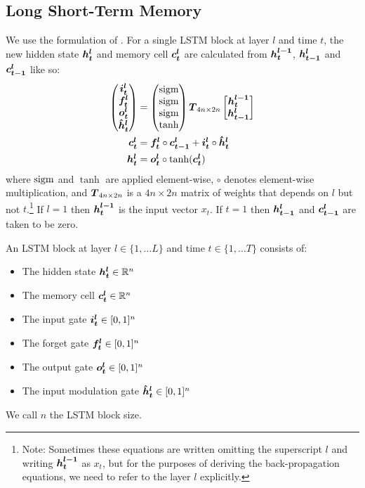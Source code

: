 \subsection{Long Short-Term Memory}
We use the formulation of \cite{zaremba14}.
For a single LSTM block at layer $l$ and time $t$, the new hidden state $\mbox{\boldmath{$h^l_t$}}$ and memory cell $\mbox{\boldmath{$c^l_t$}}$ are calculated from $\mbox{\boldmath{$h_t^{l-1}$}}$, $\mbox{\boldmath{$h_{t-1}^l$}}$ and $\mbox{\boldmath{$c_{t-1}^l$}}$ like so:
\begin{align}
\label{eqn:LSTMdef1}
\begin{pmatrix}
\mbox{\boldmath{$i^l_t$}} \\
\mbox{\boldmath{$f^l_t$}} \\
\mbox{\boldmath{$o^l_t$}} \\
\mbox{\boldmath{$\hat{h}^l_t$}}
\end{pmatrix}
&= 
\begin{pmatrix}
\operatorname{sigm} \\
\operatorname{sigm} \\
\operatorname{sigm} \\
\tanh
\end{pmatrix}
\mbox{\boldmath{$T$}}_{4n \times 2n}
\begin{bmatrix}
  \mbox{\boldmath{$h_t^{l-1}$}} \\
  \mbox{\boldmath{$h_{t-1}^l$}}
 \end{bmatrix} \\
\mbox{\boldmath{$c^l_t$}} &= \mbox{\boldmath{$f^l_t$}} \circ \mbox{\boldmath{$c_{t-1}^l$}} + \mbox{\boldmath{$i^l_t$}} \circ \mbox{\boldmath{$\hat{h}^l_t$}} \\
\mbox{\boldmath{$h^l_t$}} &= \mbox{\boldmath{$o^l_t$}} \circ \tanh(\mbox{\boldmath{$c^l_t$}})
\end{align}
where $\operatorname{sigm}$ and $\tanh$ are applied element-wise, $\circ$ denotes element-wise multiplication, 
and $\mbox{\boldmath{$T$}}_{4n \times 2n}$ is a $4n \times 2n$ matrix of weights that depends on $l$ but not $t$.\footnote{Note: Sometimes these equations are written omitting the superscript $l$ and writing $\mbox{\boldmath{$h_t^{l-1}$}}$ as $x_t$, but for the purposes of deriving the back-propagation equations, we need to refer to the layer $l$ explicitly.}
If $l=1$ then $\mbox{\boldmath{$h_t^{l-1}$}}$ is the input vector $x_t$.
If $t=1$ then $\mbox{\boldmath{$h_{t-1}^l$}}$ and $\mbox{\boldmath{$c_{t-1}^l$}}$ are taken to be zero.

An LSTM block at layer $l \in \{1, \dots L\}$ and time $t \in \{1, \dots T\}$ consists of:
\begin{itemize}
\item The hidden state $\mbox{\boldmath{$h^l_t$}} \in \mathbb{R}^n$
\item The memory cell $\mbox{\boldmath{$c^l_t$}} \in \mathbb{R}^n$
\item The input gate $\mbox{\boldmath{$i^l_t$}} \in [0,1]^n$
\item The forget gate $\mbox{\boldmath{$f^l_t$}} \in [0,1]^n$
\item The output gate $\mbox{\boldmath{$o^l_t$}} \in [0,1]^n$
\item The input modulation gate $\mbox{\boldmath{$\hat{h}^l_t$}} \in [0,1]^n$
\end{itemize}
We call $n$ the LSTM block size.

